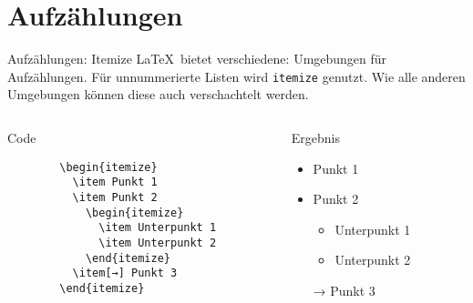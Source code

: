 \section{Aufzählungen}

\begin{frame}[fragile]{Aufzählungen: Itemize}
  \LaTeX\ bietet verschiedene: Umgebungen für Aufzählungen.
  Für unnummerierte Listen wird \texttt{itemize} genutzt.
  Wie alle anderen Umgebungen können diese auch verschachtelt werden.
  \begin{columns}[onlytextwidth, t]
    \begin{column}{0.48\textwidth}
      \begin{block}{Code}
        \begin{lstlisting}
        \begin{itemize}
          \item Punkt 1
          \item Punkt 2
            \begin{itemize}
              \item Unterpunkt 1
              \item Unterpunkt 2
            \end{itemize}
          \item[→] Punkt 3
        \end{itemize}
        \end{lstlisting}
      \end{block}
    \end{column}
    \begin{column}{0.48\textwidth}
      \begin{block}{Ergebnis}
        \begin{itemize}
          \item Punkt 1
          \item Punkt 2
            \begin{itemize}
              \item Unterpunkt 1
              \item Unterpunkt 2
            \end{itemize}
          \item[→] Punkt 3
        \end{itemize}
      \end{block}
    \end{column}
  \end{columns}
\end{frame}

